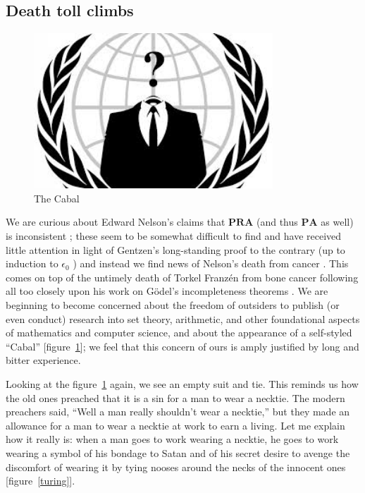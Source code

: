 \documentclass[letterpaper]{article}
\begin{document}
\subsection{Death toll climbs}
\begin{figure}
	\centering
	\includegraphics[width=0.8\textwidth]{images/mmm.jpg}
	\caption{The Cabal}
	\label{figcabal}
\end{figure}
We are curious about Edward Nelson's claims that $\mathbf{PRA}$ (and thus $\mathbf{PA}$ as well) is inconsistent \cite{nelson2015inc}; these seem to be somewhat difficult to find and have received little attention in light of Gentzen's long-standing proof to the contrary (up to induction to $\epsilon_0$ \cite{gentzen1936,takeuti2013proof}) and instead we find news of Nelson's death from cancer \cite{kelly2014ed}.  This comes on top of the untimely death of Torkel Franz{\'e}n from bone cancer following all too closely upon his work on G{\"o}del's incompleteness theorems \cite{franzen2003,franzen2005}.  We are beginning to become concerned about the freedom of outsiders to publish (or even conduct) research into set theory, arithmetic, and other foundational aspects of mathematics and computer science, and about the appearance of a self-styled ``Cabal'' \cite{wiki2016cabal,neeman2016} [figure~\ref{figcabal}];  we feel that this concern of ours is amply justified by long and bitter experience.

Looking at the figure~\ref{figcabal} again, we see an empty suit and tie.  This reminds us how the old ones preached that it is a sin for a man to wear a necktie.  The modern preachers said, ``Well a man really shouldn't wear a necktie,'' but they made an allowance for a man to wear a necktie at work to earn a living.  Let me explain how it really is:  when a man goes to work wearing a necktie, he goes to work wearing a symbol of his bondage to Satan and of his secret desire to avenge the discomfort of wearing it by tying nooses around the necks of the innocent ones [figure~\ref{turing}].
\end{document}
